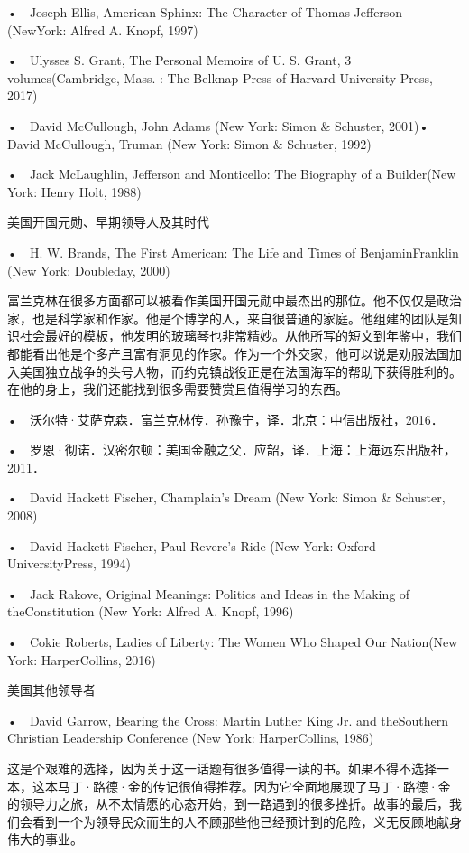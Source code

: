 •　Joseph Ellis, American Sphinx: The Character of Thomas Jefferson (NewYork: Alfred A. Knopf, 1997)



•　Ulysses S. Grant, The Personal Memoirs of U. S. Grant, 3 volumes(Cambridge, Mass. : The Belknap Press of Harvard University Press, 2017)

•　David McCullough, John Adams (New York: Simon \& Schuster, 2001)•　David McCullough, Truman (New York: Simon \& Schuster, 1992)

•　Jack McLaughlin, Jefferson and Monticello: The Biography of a Builder(New York: Henry Holt, 1988)


美国开国元勋、早期领导人及其时代


•　H. W. Brands, The First American: The Life and Times of BenjaminFranklin (New York: Doubleday, 2000)

富兰克林在很多方面都可以被看作美国开国元勋中最杰出的那位。他不仅仅是政治家，也是科学家和作家。他是个博学的人，来自很普通的家庭。他组建的团队是知识社会最好的模板，他发明的玻璃琴也非常精妙。从他所写的短文到年鉴中，我们都能看出他是个多产且富有洞见的作家。作为一个外交家，他可以说是劝服法国加入美国独立战争的头号人物，而约克镇战役正是在法国海军的帮助下获得胜利的。在他的身上，我们还能找到很多需要赞赏且值得学习的东西。

•　沃尔特·艾萨克森．富兰克林传．孙豫宁，译．北京：中信出版社，2016．


•　罗恩·彻诺．汉密尔顿：美国金融之父．应韶，译．上海：上海远东出版社，2011．

•　David Hackett Fischer, Champlain’s Dream (New York: Simon \& Schuster, 2008)

•　David Hackett Fischer, Paul Revere’s Ride (New York: Oxford UniversityPress, 1994)


•　Jack Rakove, Original Meanings: Politics and Ideas in the Making of theConstitution (New York: Alfred A. Knopf, 1996)

•　Cokie Roberts, Ladies of Liberty: The Women Who Shaped Our Nation(New York: HarperCollins, 2016)


美国其他领导者

•　David Garrow, Bearing the Cross: Martin Luther King Jr. and theSouthern Christian Leadership Conference (New York: HarperCollins, 1986)

这是个艰难的选择，因为关于这一话题有很多值得一读的书。如果不得不选择一本，这本马丁·路德·金的传记很值得推荐。因为它全面地展现了马丁·路德·金的领导力之旅，从不太情愿的心态开始，到一路遇到的很多挫折。故事的最后，我们会看到一个为领导民众而生的人不顾那些他已经预计到的危险，义无反顾地献身伟大的事业。

